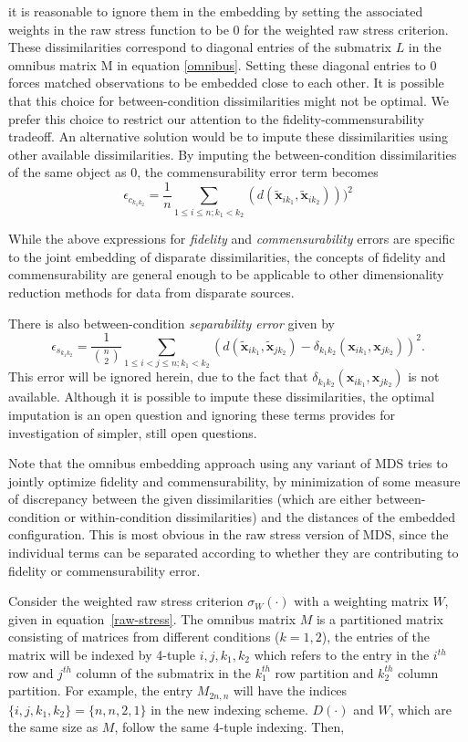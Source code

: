 \documentclass[12pt,oneside,final]{thesis}\usepackage[]{graphicx}\usepackage[]{color}
\begin{document}
it is reasonable to  ignore them in the embedding by setting the associated weights in the raw stress function to be 0 for the weighted raw stress criterion. These dissimilarities correspond to  diagonal  entries of the  submatrix $L$ in  the omnibus matrix  M in equation \eqref{omnibus}. Setting these diagonal entries to $0$ forces matched observations to be embedded close to each other.  It is possible that this choice for between-condition dissimilarities might not be optimal. 
 We prefer this choice to  restrict our attention to  the fidelity-commensurability tradeoff. An alternative solution would be to impute these dissimilarities using other available dissimilarities.
By imputing the between-condition dissimilarities of the same object as 0, the commensurability error  term becomes
  \[
\epsilon_{c_{k_1k_2}} = \frac{1}{n} \sum_{1 \leq i \leq n;k_1< k_2} (d(\widetilde{\bm{x}}_{ik_1},\widetilde{\bm{x}}_{ik_2})))^2
\]



While  the above expressions for  \emph{fidelity} and  \emph{commensurability} errors  are specific to the joint embedding of disparate dissimilarities, the concepts of fidelity and commensurability are  general enough to be applicable to other dimensionality reduction methods for data from disparate sources. 

 There is also between-condition {\em separability error} given by
    $$\epsilon_{s_{k_1k_2}} = \frac{1}{{{n}\choose{2}}} \sum_{1 \leq i < j \leq n;k_1 <k_2} (d(\widetilde{\bm{x}}_{ik_1},\widetilde{\bm{x}}_{jk_2})-{ \delta_{k_1k_2}}(\bm{x}_{ik_1},\bm{x}_{jk_2}))^2.$$ This error will be ignored herein, due to the fact that 
$\delta_{k_1k_2}(\bm{x}_{ik_1},\bm{x}_{jk_2})$ is not  available. Although it is possible to impute these dissimilarities, the optimal  imputation is an open question and ignoring these terms provides for investigation of simpler, still open questions.

Note that the omnibus embedding approach using any variant of MDS tries to jointly optimize fidelity and commensurability, by minimization of some measure of discrepancy between the given dissimilarities (which are either between-condition or within-condition dissimilarities) and the distances of the embedded configuration. This is most obvious in the  raw stress version of  MDS, since the individual terms can be separated according to whether they are contributing to  fidelity or  commensurability  error.

 Consider the weighted raw stress criterion $\sigma_{W}(\cdot)$ with a weighting matrix $W$, given in equation~\eqref{raw-stress}.
 The omnibus matrix $M$  is a partitioned matrix consisting of matrices from different conditions ($k={1,2}$),  the entries of the matrix will be indexed by 4-tuple ${i,j,k_1,k_2}$ which refers to the entry in the $i^{th}$ row and $j^{th}$ column of the submatrix in  the $k_1^{th}$  row partition and   $k_2^{th}$ column partition. For example, the entry ${M}_{2n,n}$ will have the indices $\{i,j,k_1,k_2\}=\{n,n,2,1\}$ in the new indexing scheme. $D(\cdot)$ and $W$, which are the same size as $M$, follow the same 4-tuple indexing. Then,
 
\end{document}
